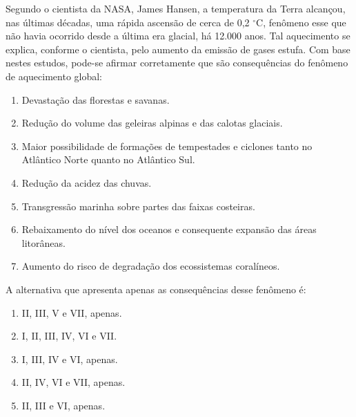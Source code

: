 Segundo o cientista da NASA, James Hansen, a temperatura da Terra alcançou, nas últimas décadas, uma rápida ascensão de cerca de 0,2 $^\circ$C, fenômeno esse que não havia ocorrido desde a última era glacial, há 12.000 anos. Tal aquecimento se explica, conforme o cientista, pelo aumento da emissão de gases estufa. Com base nestes estudos, pode-se afirmar corretamente que são consequências do fenômeno de aquecimento global:

\begin{enumerate}[label = (\Roman*)]
	\item Devastação das florestas e savanas.
	\item Redução do volume das geleiras alpinas e das calotas glaciais.
	\item Maior possibilidade de formações de tempestades e ciclones tanto no Atlântico Norte quanto no Atlântico Sul.
	\item Redução da acidez das chuvas.
	\item Transgressão marinha sobre partes das faixas costeiras.
	\item Rebaixamento do nível dos oceanos e consequente expansão das áreas litorâneas.
	\item Aumento do risco de degradação dos ecossistemas coralíneos.
\end{enumerate}
 
 A alternativa que apresenta apenas as consequências desse fenômeno é:


\begin{enumerate}[label = (\alph*)]
	\item II, III, V e VII, apenas.
	\item I, II, III, IV, VI e VII.
	\item I, III, IV e VI, apenas.
	\item II, IV, VI e VII, apenas.
	\item II, III e VI, apenas.
\end{enumerate}
